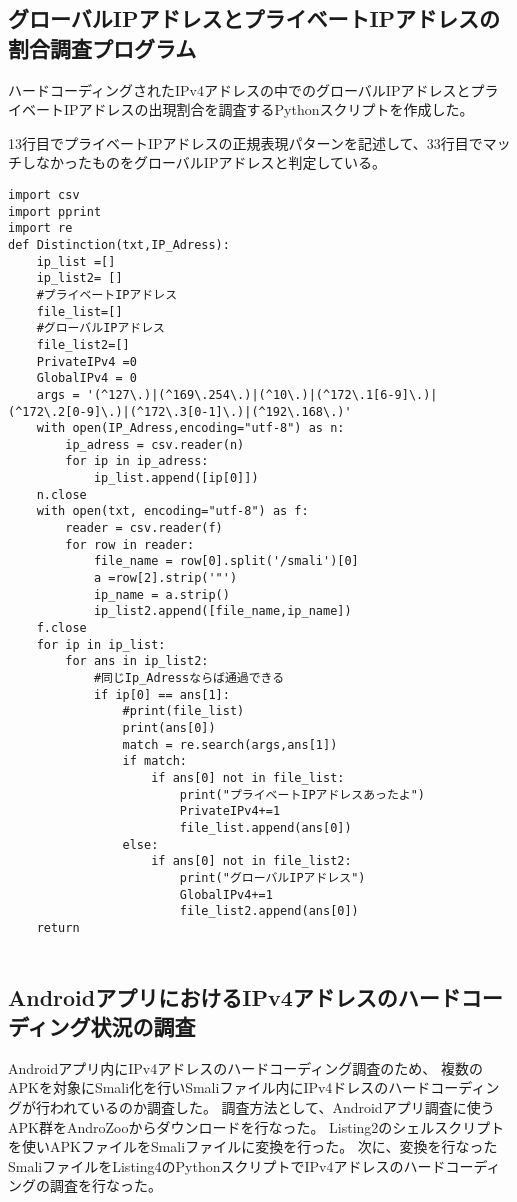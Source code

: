 \documentclass[a4j]{jarticle}
\begin{document}
\subsection{グローバルIPアドレスとプライベートIPアドレスの割合調査プログラム}
ハードコーディングされたIPv4アドレスの中でのグローバルIPアドレスとプライベートIPアドレスの出現割合を調査するPythonスクリプトを作成した。

13行目でプライベートIPアドレスの正規表現パターンを記述して、33行目でマッチしなかったものをグローバルIPアドレスと判定している。

\begin{lstlisting}[caption=ハードコーディングされたIPv4アドレスの中でのグローバルIPアドレスとプライベートIPアドレスの出現割合を調査するPythonスクリプト]
import csv
import pprint
import re
def Distinction(txt,IP_Adress):
	ip_list =[]
	ip_list2= []
	#プライベートIPアドレス
	file_list=[]
	#グローバルIPアドレス
	file_list2=[]
	PrivateIPv4 =0
	GlobalIPv4 = 0
	args = '(^127\.)|(^169\.254\.)|(^10\.)|(^172\.1[6-9]\.)|(^172\.2[0-9]\.)|(^172\.3[0-1]\.)|(^192\.168\.)'
	with open(IP_Adress,encoding="utf-8") as n:
		ip_adress = csv.reader(n)
		for ip in ip_adress:
			ip_list.append([ip[0]])
	n.close
	with open(txt, encoding="utf-8") as f:
		reader = csv.reader(f)
		for row in reader:
			file_name = row[0].split('/smali')[0]
			a =row[2].strip('"')
			ip_name = a.strip()
			ip_list2.append([file_name,ip_name])
	f.close
	for ip in ip_list:
		for ans in ip_list2:
			#同じIp_Adressならば通過できる
			if ip[0] == ans[1]:
				#print(file_list)
				print(ans[0])
				match = re.search(args,ans[1])
				if match:
					if ans[0] not in file_list:
						print("プライベートIPアドレスあったよ")
						PrivateIPv4+=1
						file_list.append(ans[0])
				else:
					if ans[0] not in file_list2:
						print("グローバルIPアドレス")
						GlobalIPv4+=1
						file_list2.append(ans[0])
	return
	
\end{lstlisting}

\subsection{AndroidアプリにおけるIPv4アドレスのハードコーディング状況の調査}
Androidアプリ内にIPv4アドレスのハードコーディング調査のため、
複数のAPKを対象にSmali化を行いSmaliファイル内にIPv4ドレスのハードコーディングが行われているのか調査した。
調査方法として、Androidアプリ調査に使うAPK群をAndroZooからダウンロードを行なった。
Listing2のシェルスクリプトを使いAPKファイルをSmaliファイルに変換を行った。
次に、変換を行なったSmaliファイルをListing4のPythonスクリプトでIPv4アドレスのハードコーディングの調査を行なった。
\end{document}
